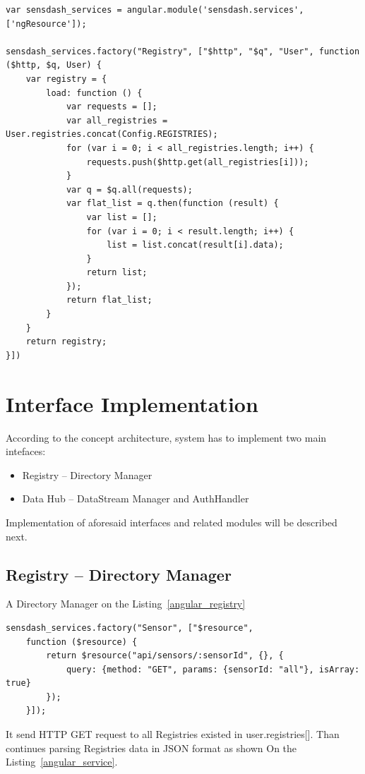     \begin{lstlisting}[label=angular_service,caption=Factory Service of Registry]
var sensdash_services = angular.module('sensdash.services', ['ngResource']);

sensdash_services.factory("Registry", ["$http", "$q", "User", function ($http, $q, User) {
    var registry = {
        load: function () {
            var requests = [];
            var all_registries = User.registries.concat(Config.REGISTRIES);
            for (var i = 0; i < all_registries.length; i++) {
                requests.push($http.get(all_registries[i]));
            }
            var q = $q.all(requests);
            var flat_list = q.then(function (result) {
                var list = [];
                for (var i = 0; i < result.length; i++) {
                    list = list.concat(result[i].data);
                }
                return list;
            });
            return flat_list;
        }
    }
    return registry;
}])
    \end{lstlisting}


\section{Interface Implementation}
	 According to the concept architecture, system has to implement two main intefaces:
	 \begin{itemize}
	 \item Registry -- Directory Manager
	 \item Data Hub -- DataStream Manager and AuthHandler 
	 \end{itemize}
	 Implementation of aforesaid interfaces and related modules will be described next.

\subsection{Registry -- Directory Manager}
    A Directory Manager on the Listing~\ref{angular_registry}
    \begin{lstlisting}[label=angular_registry,caption=Factory Service of Registry]
    sensdash_services.factory("Sensor", ["$resource",
    function ($resource) {
        return $resource("api/sensors/:sensorId", {}, {
            query: {method: "GET", params: {sensorId: "all"}, isArray: true}
        });
    }]);
    \end{lstlisting}
It send HTTP GET request to all Registries existed in user.registries[]. Than continues parsing Registries data in JSON format as shown On the Listing~\ref{angular_service}. 

